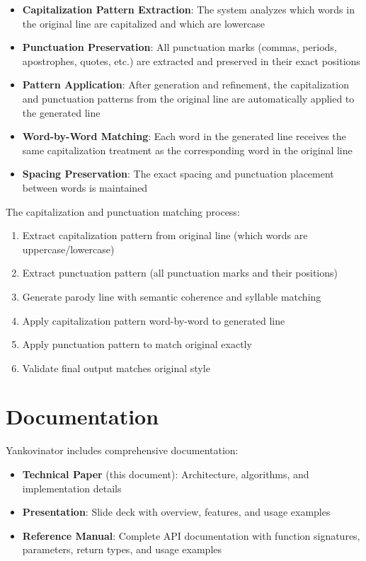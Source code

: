 \documentclass[11pt,a4paper]{article}
\begin{document}
\begin{itemize}
    \item \textbf{Capitalization Pattern Extraction}: The system analyzes which words in the original line are capitalized and which are lowercase
    \item \textbf{Punctuation Preservation}: All punctuation marks (commas, periods, apostrophes, quotes, etc.) are extracted and preserved in their exact positions
    \item \textbf{Pattern Application}: After generation and refinement, the capitalization and punctuation patterns from the original line are automatically applied to the generated line
    \item \textbf{Word-by-Word Matching}: Each word in the generated line receives the same capitalization treatment as the corresponding word in the original line
    \item \textbf{Spacing Preservation}: The exact spacing and punctuation placement between words is maintained
\end{itemize}

The capitalization and punctuation matching process:
\begin{enumerate}
    \item Extract capitalization pattern from original line (which words are uppercase/lowercase)
    \item Extract punctuation pattern (all punctuation marks and their positions)
    \item Generate parody line with semantic coherence and syllable matching
    \item Apply capitalization pattern word-by-word to generated line
    \item Apply punctuation pattern to match original exactly
    \item Validate final output matches original style
\end{enumerate}

\section{Documentation}

Yankovinator includes comprehensive documentation:

\begin{itemize}
    \item \textbf{Technical Paper} (this document): Architecture, algorithms, and implementation details
    \item \textbf{Presentation}: Slide deck with overview, features, and usage examples
    \item \textbf{Reference Manual}: Complete API documentation with function signatures, parameters, return types, and usage examples
\end{itemize}
\end{document}
